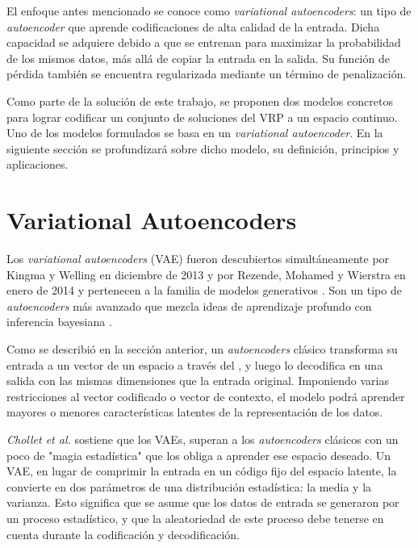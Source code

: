El enfoque antes mencionado se conoce como \textit{variational autoencoders}: un tipo de \textit{autoencoder} que aprende codificaciones de alta calidad de la entrada. Dicha capacidad se adquiere debido a que se entrenan para maximizar la probabilidad de los mismos datos, más allá de copiar la entrada en la salida. Su función de pérdida también se encuentra regularizada mediante un término de penalización.

 Como parte de la solución de este trabajo, se proponen dos modelos concretos para lograr codificar un conjunto de soluciones del VRP a un espacio continuo. Uno de los modelos formulados se basa en un \textit{variational autoencoder}. En la siguiente sección se profundizará sobre dicho modelo, su definición, principios y aplicaciones.


\section{Variational Autoencoders}\label{2-VAE}

Los \textit{variational autoencoders} (VAE) fueron descubiertos simultáneamente por Kingma y Welling en diciembre de 2013 y por Rezende, Mohamed y Wierstra en enero de 2014 \cite{Chollet} y pertenecen a la familia de modelos generativos \cite{BengioGood, Advanced, Chollet}. Son un tipo de \textit{autoencoders} más avanzado que mezcla ideas de aprendizaje profundo con inferencia bayesiana \cite{Chollet}.

Como se describió en la sección anterior, un \textit{autoencoders} clásico transforma su entrada a un vector de un espacio a través del , y luego lo decodifica en una salida con las mismas dimensiones que la entrada original. Imponiendo varias restricciones al vector codificado o vector de contexto, el modelo podrá aprender mayores o menores características latentes de la representación de los datos. 

\textit{Chollet et al.} \cite{Chollet} sostiene que los VAEs, superan a los \textit{autoencoders} clásicos con un poco de "magia estadística" que los obliga a aprender ese espacio deseado. Un VAE, en lugar de comprimir la entrada en un código fijo del espacio latente, la convierte en dos parámetros de una distribución estadística: la media y la varianza. Esto significa que se asume que los datos de entrada se generaron por un proceso estadístico, y que la aleatoriedad de este proceso debe tenerse en cuenta durante la codificación y decodificación.

